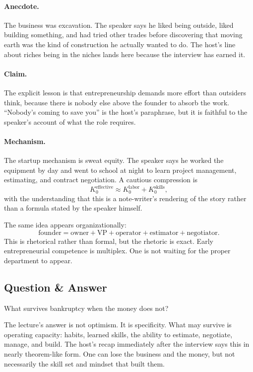 \paragraph{Anecdote.}
The business was excavation. The speaker says he liked being outside, liked building something, and had tried other trades before discovering that moving earth was the kind of construction he actually wanted to do. The host's line about riches being in the niches lands here because the interview has earned it.

\paragraph{Claim.}
The explicit lesson is that entrepreneurship demands more effort than outsiders think, because there is nobody else above the founder to absorb the work. ``Nobody's coming to save you'' is the host's paraphrase, but it is faithful to the speaker's account of what the role requires.

\paragraph{Mechanism.}
The startup mechanism is sweat equity. The speaker says he worked the equipment by day and went to school at night to learn project management, estimating, and contract negotiation. A cautious compression is
\begin{equation}
K_0^{\text{effective}} \approx K_0^{\text{labor}} + K_0^{\text{skills}},
\end{equation}
with the understanding that this is a note-writer's rendering of the story rather than a formula stated by the speaker himself.

The same idea appears organizationally:
\begin{equation}
\text{founder}
=
\text{owner}
+
\text{VP}
+
\text{operator}
+
\text{estimator}
+
\text{negotiator}.
\end{equation}
This is rhetorical rather than formal, but the rhetoric is exact. Early entrepreneurial competence is multiplex. One is not waiting for the proper department to appear.

\subsection{Question \& Answer}

What survives bankruptcy when the money does not?

The lecture's answer is not optimism. It is specificity. What may survive is operating capacity: habits, learned skills, the ability to estimate, negotiate, manage, and build. The host's recap immediately after the interview says this in nearly theorem-like form. One can lose the business and the money, but not necessarily the skill set and mindset that built them.

